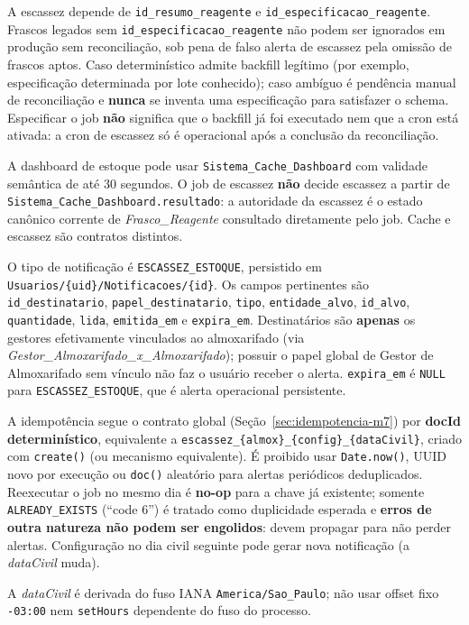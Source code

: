 \begin{regra}
A escassez depende de \texttt{id\_resumo\_reagente} e \texttt{id\_especificacao\_reagente}. Frascos legados sem \texttt{id\_especificacao\_reagente} não podem ser ignorados em produção sem reconciliação, sob pena de falso alerta de escassez pela omissão de frascos aptos. Caso determinístico admite backfill legítimo (por exemplo, especificação determinada por lote conhecido); caso ambíguo é pendência manual de reconciliação e \textbf{nunca} se inventa uma especificação para satisfazer o schema. Especificar o job \textbf{não} significa que o backfill já foi executado nem que a cron está ativada: a cron de escassez só é operacional após a conclusão da reconciliação.
\end{regra}

\begin{regra}
A dashboard de estoque pode usar \texttt{Sistema\_Cache\_Dashboard} com validade semântica de até $30$ segundos. O job de escassez \textbf{não} decide escassez a partir de \texttt{Sistema\_Cache\_Dashboard.resultado}: a autoridade da escassez é o estado canônico corrente de \textit{Frasco\_Reagente} consultado diretamente pelo job. Cache e escassez são contratos distintos.
\end{regra}

\begin{regra}
O tipo de notificação é \texttt{ESCASSEZ\_ESTOQUE}, persistido em \texttt{Usuarios/\{uid\}/Notificacoes/\{id\}}. Os campos pertinentes são \texttt{id\_destinatario}, \texttt{papel\_destinatario}, \texttt{tipo}, \texttt{entidade\_alvo}, \texttt{id\_alvo}, \texttt{quantidade}, \texttt{lida}, \texttt{emitida\_em} e \texttt{expira\_em}. Destinatários são \textbf{apenas} os gestores efetivamente vinculados ao almoxarifado (via \textit{Gestor\_Almoxarifado\_x\_Almoxarifado}); possuir o papel global de Gestor de Almoxarifado sem vínculo não faz o usuário receber o alerta. \texttt{expira\_em} é \texttt{NULL} para \texttt{ESCASSEZ\_ESTOQUE}, que é alerta operacional persistente.

A idempotência segue o contrato global (Seção~\ref{sec:idempotencia-m7}) por \textbf{docId determinístico}, equivalente a \texttt{escassez\_\{almox\}\_\{config\}\_\{dataCivil\}}, criado com \texttt{create()} (ou mecanismo equivalente). É proibido usar \texttt{Date.now()}, UUID novo por execução ou \texttt{doc()} aleatório para alertas periódicos deduplicados. Reexecutar o job no mesmo dia é \textbf{no-op} para a chave já existente; somente \texttt{ALREADY\_EXISTS} (``code 6'') é tratado como duplicidade esperada e \textbf{erros de outra natureza não podem ser engolidos}: devem propagar para não perder alertas. Configuração no dia civil seguinte pode gerar nova notificação (a \textit{dataCivil} muda).

A \textit{dataCivil} é derivada do fuso IANA \texttt{America/Sao\_Paulo}; não usar offset fixo \texttt{-03:00} nem \texttt{setHours} dependente do fuso do processo.
\end{regra}

